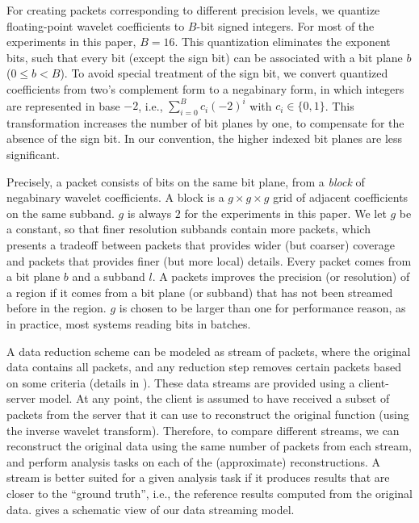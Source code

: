 For creating packets corresponding to different precision levels, we quantize floating-point wavelet
coefficients to $B$-bit signed integers. For most of the experiments in this paper, $B=16$. This
quantization eliminates the exponent bits, such that every bit (except the sign bit) can be
associated with a bit plane $b$ ($0\leq b < B$). To avoid special treatment of the sign bit, we
convert quantized coefficients from two's complement form to a negabinary form, in which integers
are represented in base $-2$, i.e., $\sum_{i=0}^{B}{c_i(-2)^i}$ with $c_i\in \{0,1\}$. This
transformation increases the number of bit planes by one, to compensate for the absence of the sign
bit. In our convention, the higher indexed bit planes are less significant.

Precisely, a packet consists of bits on the same bit plane, from a \emph{block} of negabinary
wavelet coefficients. A block is a $g\times g\times g$ grid of adjacent coefficients on the same
subband. $g$ is always $2$ for the experiments in this paper. We let $g$ be a constant, so that
finer resolution subbands contain more packets, which presents a tradeoff between packets that
provides wider (but coarser) coverage and packets that provides finer (but more local) details.
Every packet comes from a bit plane $b$ and a subband $l$. A packets improves the precision (or
resolution) of a region if it comes from a bit plane (or subband) that has not been streamed before
in the region. $g$ is chosen to be larger than one for performance reason, as in practice, most
systems reading bits in batches.

A data reduction scheme can be modeled as stream of packets, where the original data contains all
packets, and any reduction step removes certain packets based on some criteria (details in
).  These data streams are provided using a client-server model. At
any point, the client is assumed to have received a subset of packets from the server that it can
use to reconstruct the original function (using the inverse wavelet transform). Therefore, to
compare different streams, we can reconstruct the original data using the same number of packets
from each stream, and perform analysis tasks on each of the (approximate) reconstructions. A stream
is better suited for a given analysis task if it produces results that are closer to the ``ground
truth'', i.e., the reference results computed from the original data.  gives a
schematic view of our data streaming model.

